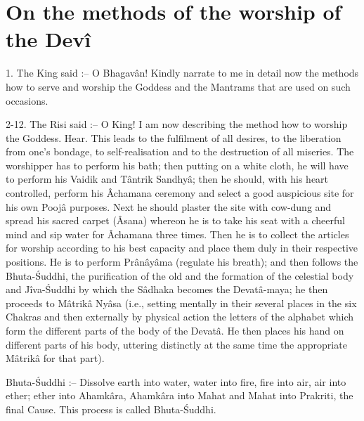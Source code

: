 ﻿\chapter{On the methods of the worship of the Dev\^i}

1. The King said :-- O Bhagav\^an! Kindly narrate to me in detail now the methods how to serve and worship the Goddess and the Mantrams that are used on such occasions.

2-12. The Risi said :-- O King! I am now describing the method how to worship the Goddess. Hear. This leads to the fulfilment of all desires, to the liberation from one's bondage, to self-realisation and to the destruction of all miseries. The worshipper has to perform his bath; then putting on a white cloth, he will have to perform his Vaidik and T\^antrik Sandhy\^a; then he should, with his heart controlled, perform his \^Achamana ceremony and select a good auspicious site for his own Pooj\^a purposes. Next he should plaster the site with cow-dung and spread his sacred carpet (\^Asana) whereon he is to take his seat with a cheerful mind and sip water for \^Achamana three times. Then he is to collect the articles for worship according to his best capacity and place them duly in their respective positions. He is to perform Pr\^an\^ay\^ama (regulate his breath); and then follows the Bhuta-\'Suddhi, the purification of the old and the formation of the celestial body and J\^iva-\'Suddhi by which the S\^adhaka becomes the Devat\^a-maya; he then proceeds to M\^atrik\^a Ny\^asa (i.e., setting mentally in their several places in the six Chakras and then externally by physical action the letters of the alphabet which form the different parts of the body of the Devat\^a. He then places his hand on different parts of his body, uttering distinctly at the same time the appropriate M\^atrik\^a for that part).

Bhuta-\'Suddhi :-- Dissolve earth into water, water into fire, fire into air, air into ether; ether into Ahamk\^ara, Ahamk\^ara into Mahat and Mahat into Prakriti, the final Cause. This process is called Bhuta-\'Suddhi.

